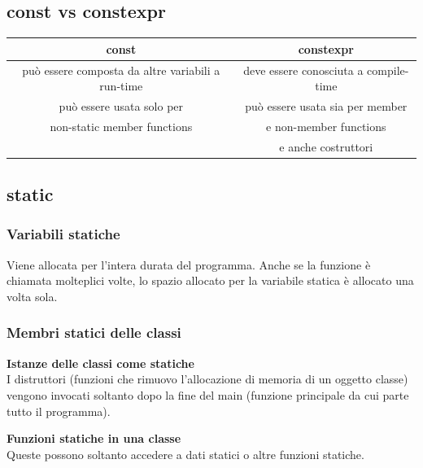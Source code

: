 \subsection{const vs constexpr}

\begin{tabular}{|c|c|}
	\hline
	\textbf{const} & \textbf{constexpr} \\
	\hline
	\textsf{\small può essere composta da altre variabili a run-time} & \textsf{\small deve essere conosciuta a compile-time} \\
	\textsf{\small può essere usata solo per } & \textsf{\small può essere usata sia per member } \\
	\textsf{\small non-static member functions} & \textsf{\small e non-member functions} \\
	\textsf{\small } & \textsf{\small e anche costruttori} \\
	\hline
\end{tabular}\break

\subsection{static}

\subsubsection{Variabili statiche}

\textsf{\small Viene allocata per l'intera durata del programma. Anche se la funzione è chiamata molteplici volte, lo spazio allocato per la variabile statica è allocato una volta sola.} \\

\subsubsection{Membri statici delle classi} %

\centering\textbf{Istanze delle classi come statiche} \\

\textsf{\small I distruttori (funzioni che rimuovo l'allocazione di memoria di un oggetto classe) vengono invocati soltanto dopo la fine del main (funzione principale da cui parte tutto il programma).} \break

\centering\textbf{Funzioni statiche in una classe} \\

\textsf{\small Queste possono soltanto accedere a dati statici o altre funzioni statiche.} \\

